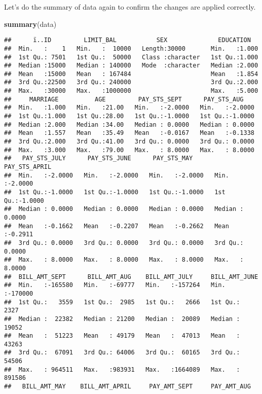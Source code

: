 \documentclass[]{article}
\newenvironment{Shaded}{\begin{snugshade}}{\end{snugshade}}
\newcommand{\KeywordTok}[1]{\textcolor[rgb]{0.13,0.29,0.53}{\textbf{#1}}}
\newcommand{\NormalTok}[1]{#1}
\begin{document}
Let's do the summary of data again to confirm the changes are applied
correctly.

\begin{Shaded}
\begin{Highlighting}[]
\KeywordTok{summary}\NormalTok{(data)}
\end{Highlighting}
\end{Shaded}

\begin{verbatim}
##      ï..ID         LIMIT_BAL           SEX              EDUCATION    
##  Min.   :    1   Min.   :  10000   Length:30000       Min.   :1.000  
##  1st Qu.: 7501   1st Qu.:  50000   Class :character   1st Qu.:1.000  
##  Median :15000   Median : 140000   Mode  :character   Median :2.000  
##  Mean   :15000   Mean   : 167484                      Mean   :1.854  
##  3rd Qu.:22500   3rd Qu.: 240000                      3rd Qu.:2.000  
##  Max.   :30000   Max.   :1000000                      Max.   :5.000  
##     MARRIAGE          AGE         PAY_STS_SEPT      PAY_STS_AUG     
##  Min.   :1.000   Min.   :21.00   Min.   :-2.0000   Min.   :-2.0000  
##  1st Qu.:1.000   1st Qu.:28.00   1st Qu.:-1.0000   1st Qu.:-1.0000  
##  Median :2.000   Median :34.00   Median : 0.0000   Median : 0.0000  
##  Mean   :1.557   Mean   :35.49   Mean   :-0.0167   Mean   :-0.1338  
##  3rd Qu.:2.000   3rd Qu.:41.00   3rd Qu.: 0.0000   3rd Qu.: 0.0000  
##  Max.   :3.000   Max.   :79.00   Max.   : 8.0000   Max.   : 8.0000  
##   PAY_STS_JULY      PAY_STS_JUNE      PAY_STS_MAY      PAY_STS_APRIL    
##  Min.   :-2.0000   Min.   :-2.0000   Min.   :-2.0000   Min.   :-2.0000  
##  1st Qu.:-1.0000   1st Qu.:-1.0000   1st Qu.:-1.0000   1st Qu.:-1.0000  
##  Median : 0.0000   Median : 0.0000   Median : 0.0000   Median : 0.0000  
##  Mean   :-0.1662   Mean   :-0.2207   Mean   :-0.2662   Mean   :-0.2911  
##  3rd Qu.: 0.0000   3rd Qu.: 0.0000   3rd Qu.: 0.0000   3rd Qu.: 0.0000  
##  Max.   : 8.0000   Max.   : 8.0000   Max.   : 8.0000   Max.   : 8.0000  
##  BILL_AMT_SEPT      BILL_AMT_AUG    BILL_AMT_JULY     BILL_AMT_JUNE    
##  Min.   :-165580   Min.   :-69777   Min.   :-157264   Min.   :-170000  
##  1st Qu.:   3559   1st Qu.:  2985   1st Qu.:   2666   1st Qu.:   2327  
##  Median :  22382   Median : 21200   Median :  20089   Median :  19052  
##  Mean   :  51223   Mean   : 49179   Mean   :  47013   Mean   :  43263  
##  3rd Qu.:  67091   3rd Qu.: 64006   3rd Qu.:  60165   3rd Qu.:  54506  
##  Max.   : 964511   Max.   :983931   Max.   :1664089   Max.   : 891586  
##   BILL_AMT_MAY    BILL_AMT_APRIL     PAY_AMT_SEPT     PAY_AMT_AUG     

\end{verbatim}
\end{document}
